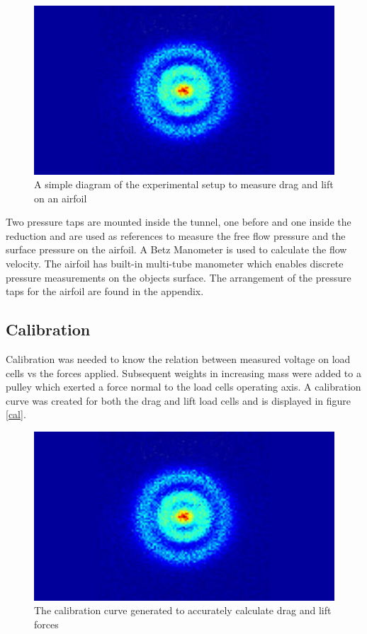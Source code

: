 \documentclass[paper=a4, fontsize=11pt, abstract=on]{scrartcl}
\numberwithin{equation}{section}		%
\numberwithin{figure}{section}			%
\numberwithin{table}{section}				%
\begin{document}
\begin{figure}[H]
\centering
\includegraphics[width=0.8\linewidth]{hyd}
\caption{A simple diagram of the experimental setup to measure drag and lift on an airfoil}
\label{sch}
\end{figure}

 Two pressure taps are mounted inside the tunnel, one before and one inside the reduction and are used as references to measure the free flow pressure and the surface pressure on the airfoil. A Betz Manometer is used to calculate the flow velocity. The airfoil has built-in multi-tube manometer which enables discrete pressure measurements on the objects surface. The arrangement of the pressure taps for the airfoil are found in the appendix.

 

\subsection{Calibration}
Calibration was needed to know the relation between measured voltage on load cells vs the forces applied. Subsequent weights in increasing mass were added to a pulley which exerted a force normal to the load cells operating axis. A calibration curve was created for both the drag and lift load cells and is displayed in figure \ref{cal}.

\begin{figure}[H]
\centering
\includegraphics[width=\linewidth]{hyd}
\caption{The calibration curve generated to accurately calculate drag and lift forces}
\label{fig1}
\end{figure}
\end{document}
